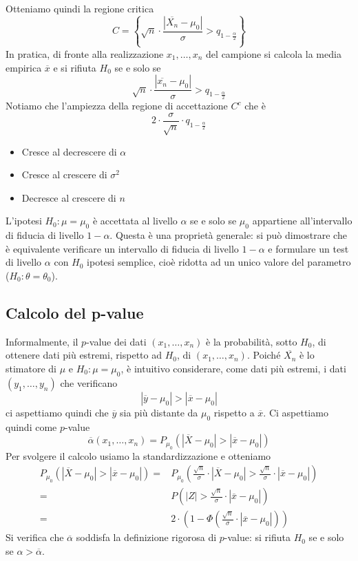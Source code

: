 Otteniamo quindi la regione critica
\[
	C = \left\{ \sqrt{n} \cdot \frac{|\overline{X_n} -
		\mu_0|}{\sigma} > q_{1 - \frac{\alpha}{2}} \right\}
\]
In pratica, di fronte alla realizzazione $x_1, \dots, x_n$ del campione si calcola la media
empirica $\overline{x}$ e si rifiuta $H_0$ se e solo se
\[ \sqrt{n} \cdot \frac{|\overline{x_n} - \mu_0|}{\sigma} > q_{1 - \frac{\alpha}{2}}  \]
Notiamo che l'ampiezza della regione di accettazione $C^c$ che è
\[ 2 \cdot \frac{\sigma}{\sqrt{n}} \cdot q_{1 - \frac{\alpha}{2}} \]
\begin{itemize}
	\item Cresce al decrescere di $\alpha$
	\item Cresce al crescere di $\sigma^2$
	\item Decresce al crescere di $n$
\end{itemize}

\begin{observation}
	L'ipotesi $H_0: \mu = \mu_0$ è accettata al livello $\alpha$ se e solo se $\mu_0$ appartiene
	all'intervallo di fiducia di livello $1-\alpha$. Questa è una proprietà generale: si può
	dimostrare che è equivalente verificare un intervallo di fiducia di livello $1-\alpha$ e
	formulare un test di livello $\alpha$ con $H_0$ ipotesi semplice, cioè ridotta ad un unico
	valore del parametro ($H_0 : \theta = \theta_0$).
\end{observation}

\subsection{Calcolo del p-value}
Informalmente, il $p$-value dei dati $(x_1, \dots, x_n)$ è la probabilità, sotto $H_0$, di
ottenere dati più estremi, rispetto ad $H_0$, di $(x_1, \dots, x_n)$. Poiché $\overline{X_n}$ è
lo stimatore di $\mu$ e $H_0: \mu = \mu_0$, è intuitivo considerare, come dati più estremi, i dati
$(y_1, \dots, y_n)$ che verificano
\[ |\overline{y} - \mu_0| > |\overline{x} - \mu_0| \]
ci aspettiamo quindi che $\overline{y}$ sia più distante da $\mu_0$ rispetto a $\overline{x}$. Ci
aspettiamo quindi come $p$-value
\[
	\overline{\alpha} (x_1, \dots, x_n) =
	P_{\mu_0} (|\overline{X} - \mu_0| > |\overline{x} - \mu_0|)
\]
Per svolgere il calcolo usiamo la standardizzazione e otteniamo
\begin{align*}
	P_{\mu_0} (|\overline{X} - \mu_0| > |\overline{x} - \mu_0|)
	= & P_{\mu_0} \left( \frac{\sqrt{n}}{\sigma} \cdot |\overline{X} - \mu_0| >
	\frac{\sqrt{n}}{\sigma} \cdot |\overline{x} - \mu_0| \right)                    \\
	= & P \left( |Z| > \frac{\sqrt{n}}{\sigma} \cdot |\overline{x} - \mu_0| \right) \\
	= & 2 \cdot \left(1 - \Phi \left(\frac{\sqrt{n}}{\sigma} \cdot
		|\overline{x} - \mu_0| \right) \right)
\end{align*}
Si verifica che $\overline{\alpha}$ soddisfa la definizione rigorosa di $p$-value: si rifiuta $H_0$
se e solo se $\alpha > \overline{\alpha}$.

